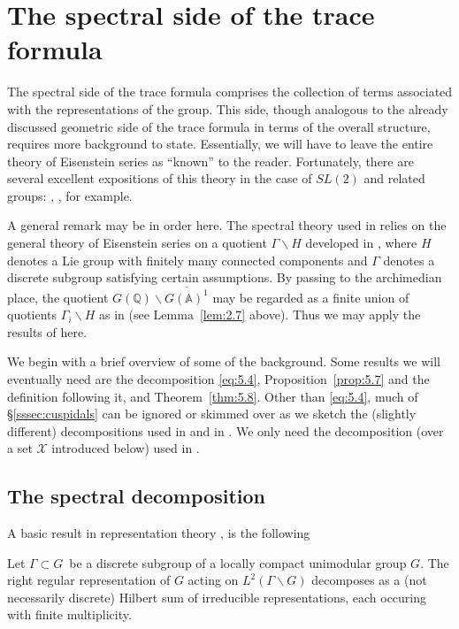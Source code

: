 \section{The spectral side of the trace formula}\label{sec:spectral}

The spectral side of the trace formula comprises the collection of terms
associated with the representations of the group. This side, though
analogous to the already discussed geometric side of the trace formula in
terms of the overall structure, requires more background to state.
Essentially, we will have to leave the entire theory of Eisenstein series as
``known'' to the reader. Fortunately, there are several excellent
expositions of this theory in the case of $SL(2)$ and related groups:
\cite{L1}, \cite{K2}, \cite{KP} for example.

A general remark may be in order here. The spectral theory used in \cite{A2}
relies on the general theory of Eisenstein series on a quotient $\Gamma
\backslash H$ developed in \cite{L1}, where $H$ denotes a Lie group with finitely
many connected components and $\Gamma $ denotes a discrete subgroup
satisfying certain assumptions. By passing to the archimedian place, the
quotient $G({\mathbb{Q}})\backslash \overline{G({\mathbb{A}})^1}$ may be regarded as a
finite union of quotients $\Gamma _i\backslash H$ as in \cite{L1}
(see Lemma~\ref{lem:2.7} above). Thus we may apply the results of \cite{L1} here.

We begin with a brief overview of some of the background. Some results we
will eventually need are the decomposition \eqref{eq:5.4}, Proposition~\ref{prop:5.7}
and the definition following it, and Theorem~\ref{thm:5.8}. Other than \eqref{eq:5.4},
much of \S\ref{sssec:cuspidals} can be ignored or skimmed over as we sketch the
(slightly different) decompositions used in \cite{A1} and in \cite{A2,A3}.
We only need the decomposition (over a set ${\mathcal{X}}$ introduced below)
used in \cite{A2,A3}.

\subsection{The spectral decomposition}

A basic result in representation theory \cite[ch. 14]{Ro}, \cite[Lemma 3.2]{L2} is the
following

\begin{lemma}\label{lem:5.1}
Let $\Gamma \subset G$\ be a discrete subgroup of a locally compact
unimodular group $G$. The right regular representation of $G$
acting on $L^2(\Gamma \backslash G)$
decomposes as a (not necessarily discrete)
Hilbert sum of irreducible representations, each occuring with finite
multiplicity.
\end{lemma}

